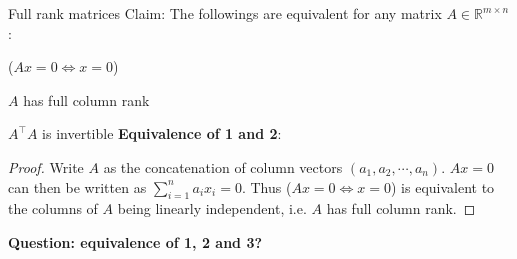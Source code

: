 \begin{frame}{Full rank matrices}
Claim: The followings are equivalent for any matrix $A \in \mathbb{R}^{m \times n}$:
\ben
\item ($Ax=0 \Leftrightarrow x=0$) 
\item $A$ has full column rank 
\item $A^\top A$ is invertible
\een
\vfill
\pause
\textbf{Equivalence of 1 and 2}:
\begin{proof}
	Write $A$ as the concatenation of column vectors $(a_1, a_2, \cdots, a_n)$. $Ax=0$ can then be written as $\sum_{i=1}^n a_i x_i=0$. Thus ($Ax=0 \Leftrightarrow x=0$) is equivalent to the columns of $A$ being linearly independent, i.e. $A$ has full column rank.
\end{proof}
\pause
\textbf{Question: equivalence of 1, 2 and 3?}
\end{frame}